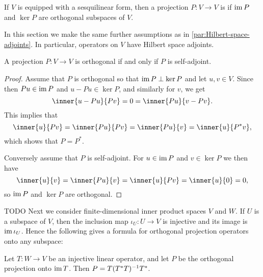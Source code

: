 If $V$ is equipped with a sesquilinear form, then a projection $P \colon V \to V$ is  if $\operatorname{im} P$ and $\ker P$ are orthogonal subspaces of $V$.

In this section we make the same further assumptions as in \cref{par:Hilbert-space-adjoints}. In particular, operators on $V$ have Hilbert space adjoints. 

\begin{proposition}
    A projection $P \colon V \to V$ is orthogonal if and only if $P$ is self-adjoint.
\end{proposition}

\begin{proof}
    Assume that $P$ is orthogonal so that $\operatorname{im} P \perp \ker P$ and let $u,v \in V$. Since then $Pu \in \operatorname{im} P$ and $u - Pu \in \ker P$, and similarly for $v$, we get
    \begin{equation*}
        \inner{u - Pu}{Pv}
            = 0
            = \inner{Pu}{v - Pv}.
    \end{equation*}
    This implies that
    \begin{equation*}
        \inner{u}{Pv}
            = \inner{Pu}{Pv}
            = \inner{Pu}{v}
            = \inner{u}{P^* v},
    \end{equation*}
    which shows that $P = P^*$.

    Conversely assume that $P$ is self-adjoint. For $u \in \operatorname{im} P$ and $v \in \ker P$ we then have
    \begin{equation*}
        \inner{u}{v}
            = \inner{Pu}{v}
            = \inner{u}{Pv}
            = \inner{u}{0}
            = 0,
    \end{equation*}
    so $\operatorname{im} P$ and $\ker P$ are orthogonal.
\end{proof}


TODO Next we consider finite-dimensional inner product spaces $V$ and $W$. If $U$ is a subspace of $V$, then the inclusion map $\iota_U \colon U \to V$ is injective and its image is $\operatorname{im} \iota_U$. Hence the following gives a formula for orthogonal projection operators onto any subspace:

\begin{proposition}
    \label{prop:projection-formula}
    Let $T \colon W \to V$ be an injective linear operator, and let $P$ be the orthogonal projection onto $\operatorname{im} T$. Then $P = T(T^* T)^{-1} T^*$.
\end{proposition}

